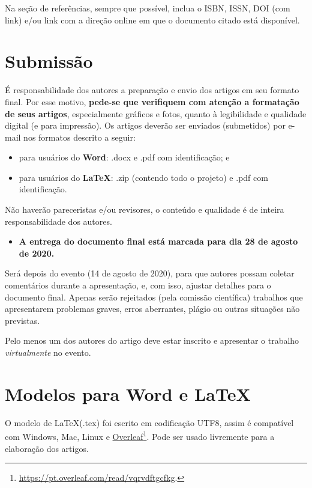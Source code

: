 \documentclass[12pt, a4paper, twoside, twocolumn]{article}
\begin{document}
Na seção de referências, sempre que possível, inclua o ISBN, ISSN, DOI (com link) e/ou link com a direção online em que o documento citado está disponível.

\section{Submissão}

É responsabilidade dos autores a preparação e envio dos artigos em seu formato final. Por esse motivo, \textbf{pede-se que verifiquem com atenção a formatação de seus artigos}, especialmente gráficos e fotos, quanto à legibilidade e qualidade digital (e para impressão). Os artigos deverão ser enviados (submetidos) por e-mail nos formatos descrito a seguir:
%
%
\begin{itemize}[noitemsep,topsep=0ex] \itemsep=5pt
	\item para usuários do \textbf{Word}: .docx e .pdf com identificação; e
	\item para usuários do \textbf{\LaTeX}\xspace: .zip (contendo todo o projeto) e .pdf com identificação.
\end{itemize}

Não haverão pareceristas e/ou revisores, o conteúdo e qualidade é de inteira responsabilidade dos autores.
%
\begin{itemize}[noitemsep,topsep=0ex] \itemsep=8pt
	\item \textbf{A entrega do documento final está marcada para dia 28 de agosto de 2020.}
\end{itemize}
%
 Será depois do evento (14 de agosto de 2020), para que autores possam coletar comentários durante a apresentação, e, com isso, ajustar detalhes para o documento final. Apenas serão rejeitados (pela comissão científica) trabalhos que apresentarem problemas graves, erros aberrantes, plágio ou outras situações não previstas.

Pelo menos um dos autores do artigo deve estar inscrito e apresentar o trabalho \textit{virtualmente} no evento.

\section{Modelos para Word e \LaTeX}
O modelo de \LaTeX\xspace (.tex) foi escrito em codificação UTF8, assim é compatível com Windows, Mac, Linux e \href{https://pt.overleaf.com/read/vqrvdftgcfkg}{Overleaf}\footnote{\url{https://pt.overleaf.com/read/vqrvdftgcfkg}.}. Pode ser usado livremente para a elaboração dos artigos.
%
\end{document}
